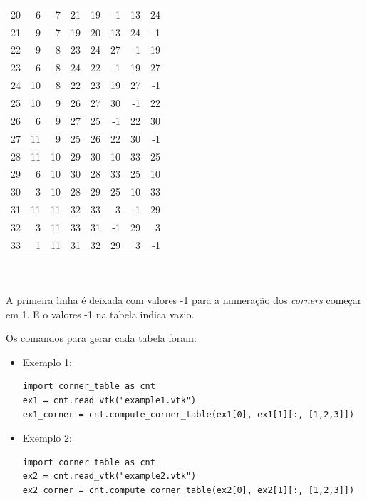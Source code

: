 \documentclass[a4paper]{article}
\begin{document}
\begin{tabular}{rrrrrrrr}
	20 &         6 &      7 &     21 &         19 &         -1 &     13 &      24 \\
	21 &         9 &      7 &     19 &         20 &         13 &     24 &      -1 \\
	22 &         9 &      8 &     23 &         24 &         27 &     -1 &      19 \\
	23 &         6 &      8 &     24 &         22 &         -1 &     19 &      27 \\
	24 &        10 &      8 &     22 &         23 &         19 &     27 &      -1 \\
	25 &        10 &      9 &     26 &         27 &         30 &     -1 &      22 \\
	26 &         6 &      9 &     27 &         25 &         -1 &     22 &      30 \\
	27 &        11 &      9 &     25 &         26 &         22 &     30 &      -1 \\
	28 &        11 &     10 &     29 &         30 &         10 &     33 &      25 \\
	29 &         6 &     10 &     30 &         28 &         33 &     25 &      10 \\
	30 &         3 &     10 &     28 &         29 &         25 &     10 &      33 \\
	31 &        11 &     11 &     32 &         33 &          3 &     -1 &      29 \\
	32 &         3 &     11 &     33 &         31 &         -1 &     29 &       3 \\
	33 &         1 &     11 &     31 &         32 &         29 &      3 &      -1 \\
	\hline
\end{tabular}\\~\\

 
 
 A primeira linha é deixada com valores -1 para a numeração dos \textit{corners} começar em 1. E o valores -1 na tabela indica vazio.
 
 Os comandos para gerar cada tabela foram:
 
 \begin{itemize}
\item Exemplo 1:
\begin{verbatim}
import corner_table as cnt
ex1 = cnt.read_vtk("example1.vtk")
ex1_corner = cnt.compute_corner_table(ex1[0], ex1[1][:, [1,2,3]])
\end{verbatim}

\item Exemplo 2:
\begin{verbatim}
import corner_table as cnt
ex2 = cnt.read_vtk("example2.vtk")
ex2_corner = cnt.compute_corner_table(ex2[0], ex2[1][:, [1,2,3]])
\end{verbatim}
 \end{itemize}
 
\end{document}
